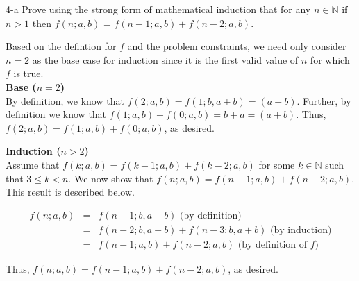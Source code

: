 \documentclass[11pt]{article}
\begin{document}
\begin{prob}{4-a}
Prove using the strong form of mathematical induction that for any $n \in \mathbb{N}$ if $n > 1$ then $f(n;a,b)$ = $f(n-1;a,b) + f(n-2;a,b)$.
\end{prob}
\begin{sol} 
Based on the defintion for $f$ and the problem constraints, we need only consider $n = 2$ as the base case for induction since it is the first valid value of $n$ for which $f$ is true. \\

\textbf{Base ($n = 2$)} \\
By definition, we know that $f(2;a,b) = f(1;b, a + b) = (a+b)$. Further, by definition we know that $f(1;a,b)+ f(0;a,b) = b + a = (a + b)$. Thus, $f(2;a,b) = f(1;a,b)+ f(0;a,b)$, as desired.

\textbf{Induction ($n > 2$)} \\
Assume that $f(k;a,b) = f(k-1;a,b)+ f(k-2;a,b)$ for some $k \in \mathbb{N}$ such that $3 \leq k < n$. We now show that $f(n;a,b) = f(n - 1;a,b)+ f(n - 2;a,b)$. This result is described below.

\begin{eqnarray*}
f(n;a,b) & = & f(n-1;b,a+b) \text{ (by definition)}\\
& = & f(n-2;b, a+b) + f(n-3;b,a+b) \text{ (by induction)}\\ 
& = & f(n-1;a,b) + f(n-2;a,b) \text{ (by definition of $f$)}
\end{eqnarray*}

Thus, $f(n;a,b) = f(n - 1;a,b)+ f(n - 2;a,b)$, as desired.

\end{sol}
\end{document}
